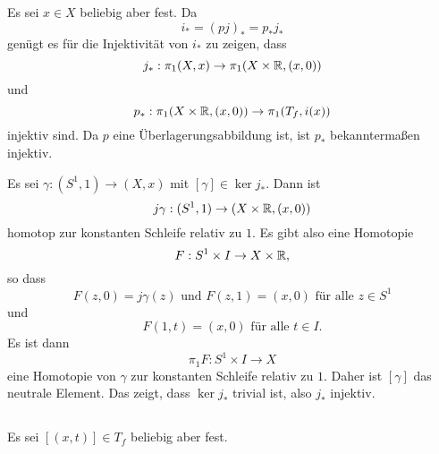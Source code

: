 \documentclass[a4paper,10pt]{article}
\begin{document}
\subsection{}
Es sei $x \in X$ beliebig aber fest. Da
\[
 i_* = (pj)_* = p_* j_*
\]
genügt es für die Injektivität von $i_*$ zu zeigen, dass
\[
 j_* : \pi_1(X,x) \to \pi_1(X \times \mathbb{R}, (x,0))
\]
und
\[
 p_* : \pi_1(X \times \mathbb{R}, (x,0)) \to \pi_1(T_f, i(x))
\]
injektiv sind. Da $p$ eine Überlagerungsabbildung ist, ist $p_*$ bekanntermaßen injektiv.

Es sei $\gamma : (S^1,1) \to (X,x)$ mit $[\gamma] \in \ker j_*$. Dann ist
\[
 j \gamma : (S^1,1) \to (X \times \mathbb{R}, (x,0))
\]
homotop zur konstanten Schleife relativ zu $1$. Es gibt also eine Homotopie
\[
 F : S^1 \times I \to X \times \mathbb{R},
\]
so dass
\[
 F(z,0) = j\gamma(z) \text{ und } F(z,1) = (x,0) \text{ für alle } z \in S^1
\]
und
\[
 F(1,t) = (x,0) \text{ für alle } t \in I.
\]
Es ist dann
\[
 \pi_1 F : S^1 \times I \to X
\]
eine Homotopie von $\gamma$ zur konstanten Schleife relativ zu $1$. Daher ist $[\gamma]$ das neutrale Element. Das zeigt, dass $\ker j_*$ trivial ist, also $j_*$ injektiv.


\subsection{}
Es sei $[(x,t)] \in T_f$ beliebig aber fest.
\end{document}

